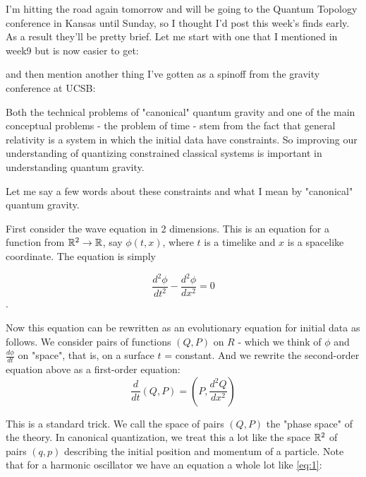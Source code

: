 
I'm hitting the road again tomorrow and will be going to the Quantum Topology conference in Kansas until Sunday, so I thought I'd post this week's finds early. As a result they'll be pretty brief. Let me start with one that I mentioned in week9 but is now easier to get:


and then mention another thing I've gotten as a spinoff from the gravity conference at UCSB:


Both the technical problems of "canonical" quantum gravity and one of the main conceptual problems - the problem of time - stem from the fact that general relativity is a system in which the initial data have constraints. So improving our understanding of quantizing constrained classical systems is important in understanding quantum gravity.

Let me say a few words about these constraints and what I mean by "canonical" quantum gravity.

First consider the wave equation in 2 dimensions. This is an equation for a function from $\mathbb R^2 \to \mathbb R$, say $\phi(t,x)$, where $t$ is a timelike and $x$ is a spacelike coordinate. The equation is simply

\[\frac{d^2\phi}{dt^2} - \frac{d^2\phi}{dx^2} = 0\].

Now this equation can be rewritten as an evolutionary equation for initial data as follows. We consider pairs of functions $(Q,P)$ on $R$ - which we think of $\phi$ and $\frac{d\phi}{dt}$ on "space", that is, on a surface $t$ = constant. And we rewrite the second-order equation above as a first-order equation:
\begin{equation}
\tag{1}\label{eq:1}
\frac{d}{dt}(Q,P) = (P, \frac{d^2Q}{dx^2})
\end{equation}

This is a standard trick. We call the space of pairs $(Q,P)$ the "phase space" of the theory. In canonical quantization, we treat this a lot like the space $\mathbb R^2$ of pairs $(q,p)$ describing the initial position and momentum of a particle. Note that for a harmonic oscillator we have an equation a whole lot like \ref{eq:1}:

